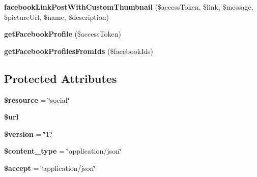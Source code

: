 \begin{DoxyCompactItemize}
\item 
\hypertarget{class_social_service_a732078c2a0ba6b7057cd67f17c891e00}{{\bfseries facebook\+Link\+Post\+With\+Custom\+Thumbnail} (\$access\+Token, \$link, \$message, \$picture\+Url, \$name, \$description)}\label{class_social_service_a732078c2a0ba6b7057cd67f17c891e00}

\item 
\hypertarget{class_social_service_a1c3a3c6d782f1582d6d0febad5ce3ba8}{{\bfseries get\+Facebook\+Profile} (\$access\+Token)}\label{class_social_service_a1c3a3c6d782f1582d6d0febad5ce3ba8}

\item 
\hypertarget{class_social_service_aa9e4fadf286350a0d1b403965bb29815}{{\bfseries get\+Facebook\+Profiles\+From\+Ids} (\$facebook\+Ids)}\label{class_social_service_aa9e4fadf286350a0d1b403965bb29815}

\end{DoxyCompactItemize}
\subsection*{Protected Attributes}
\begin{DoxyCompactItemize}
\item 
\hypertarget{class_social_service_abd4c7b8b084214b8d2533ba07fce6b83}{{\bfseries \$resource} = \char`\"{}social\char`\"{}}\label{class_social_service_abd4c7b8b084214b8d2533ba07fce6b83}

\item 
\hypertarget{class_social_service_acf215f34a917d014776ce684a9ee8909}{{\bfseries \$url}}\label{class_social_service_acf215f34a917d014776ce684a9ee8909}

\item 
\hypertarget{class_social_service_a17c8948c68aa44fa9961ae169b6a8961}{{\bfseries \$version} = \char`\"{}1.\char`\"{}}\label{class_social_service_a17c8948c68aa44fa9961ae169b6a8961}

\item 
\hypertarget{class_social_service_ae754d6373f275e781f47c8bc9b994b6d}{{\bfseries \$content\+\_\+type} = \char`\"{}application/json\char`\"{}}\label{class_social_service_ae754d6373f275e781f47c8bc9b994b6d}

\item 
\hypertarget{class_social_service_a75fc18c4ff06288ff9fdf8aba9bd1081}{{\bfseries \$accept} = \char`\"{}application/json\char`\"{}}\label{class_social_service_a75fc18c4ff06288ff9fdf8aba9bd1081}

\end{DoxyCompactItemize}
